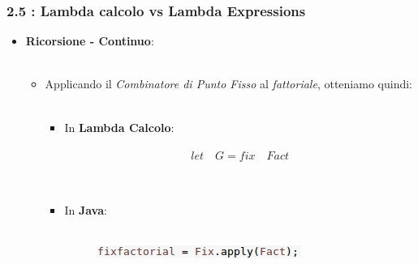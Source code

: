 \begin{frame}
	\frametitle{\textbf{2.5 : Lambda calcolo vs Lambda Expressions}}
	\begin{itemize}
		\item
			\textbf{Ricorsione - Continuo}:\\\
			\begin{itemize}
				\item 
					Applicando il \textit{Combinatore di Punto Fisso} al \textit{fattoriale}, otteniamo quindi:\\\
					\begin{itemize}
						\item 
							In \textbf{Lambda Calcolo}:\\\
								\[
									let \quad G = fix \quad Fact
								\]\\\
						\item 
							In \textbf{Java}:\\\
								\begin{figure}
									\centering
									\includegraphics[width=0.8\linewidth]{image/factok.png}
									\label{fig:identity}
								\end{figure}
					\end{itemize}
			\end{itemize}
	\end{itemize}
\end{frame}